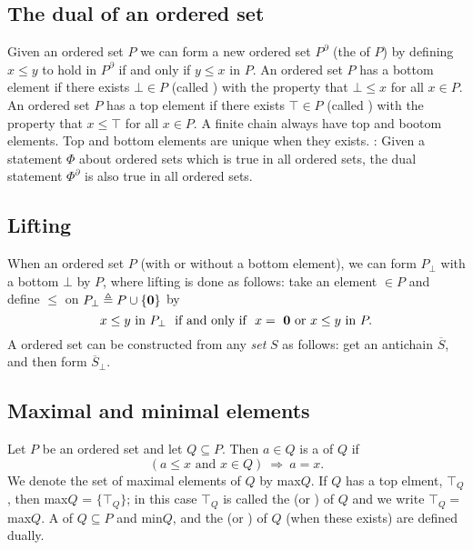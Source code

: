 \documentclass{myproc}
\def\sbf{\bfseries}
\begin{document}
\subsection{The dual of an ordered set}
\bit
\w Given an ordered set $P$ we can form a new ordered set $P^{\partial}$ (the
 of $P$) by defining $x \le y$ to hold in $P^\partial$ if and only if
$y \le x$ in $P$.
\w An ordered set $P$ has a bottom element if there exists $\bot \in P$
(called ) with the property that $\bot \le x$ for all $x \in P$.
\w An ordered set $P$ has a top element if there exists $\top \in P$
(called ) with the property that $x \le \top$ for all $x \in P$.
\w A finite chain always have top and bootom elements.
\w Top and bottom elements are unique when they exists.
\w {\sbf The duality principle}: Given a statement $\Phi$ about ordered sets
which is true in all ordered sets, the dual statement $\Phi^\partial$ 
is also true in
all ordered sets.
\eit
\subsection{Lifting}
\bit
\w When an ordered set $P$ (with or without a bottom element), 
  we can form $P_{\bot}$ with a bottom $\bot$ by  $P$, where
  lifting is done as follows:
  take an element  $\in P$ and define $\le$ on $P_\bot \triangleq P \cup
  \{\mbox{{\bf{0}}}\}$ by
 \[ x \le y \mbox{\ in\ } P_\bot
  \mbox{\ \ if and only if\ \ } x = \mbox{\ {\bf{0}}  or\ }
  x \le y \mbox{\ in\ } P.\]
\w A  ordered set can be constructed from any {\em set\/} $S$ 
  as follows: get an antichain $\overline{S}$, and then form
  $\overline{S}_\bot$. 
\eit
\subsection{Maximal and minimal elements}
\bit
\w Let $P$ be an ordered set and let $Q \subseteq P$. Then $a \in Q$ is a
 of $Q$ if 
   \[ (\mbox{$a \le x$ and $x \in Q$})\ \Rightarrow\  a = x. \]
\w We denote the set of maximal elements of $Q$ by max$Q$.
\w If $Q$ has a top elment, $\top_Q$, then max$Q$ = $\{\top_Q\}$; in this case
$\top_Q$ is called the  (or ) 
of $Q$ and we write $\top_Q =$ max$Q$. 
\w A  of $Q \subseteq P$ and min$Q$, and the  (or ) of $Q$ (when these exists) are defined dually.
\eit
\end{document}
